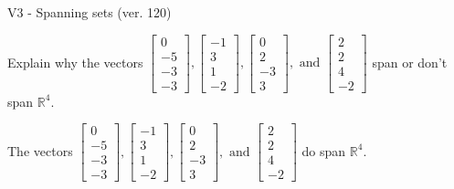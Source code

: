 \begin{exercise}
  \begin{exerciseTitle}V3 - Spanning sets (ver. 120)\end{exerciseTitle}
  \begin{exerciseStatement}
    Explain why the vectors \(\left[\begin{array}{r}
0 \\
-5 \\
-3 \\
-3
\end{array}\right] , \left[\begin{array}{r}
-1 \\
3 \\
1 \\
-2
\end{array}\right] , \left[\begin{array}{r}
0 \\
2 \\
-3 \\
3
\end{array}\right] , \text{ and } \left[\begin{array}{r}
2 \\
2 \\
4 \\
-2
\end{array}\right]\) span or don't span \(\mathbb{R}^4\). 
	


  \end{exerciseStatement}
  \begin{exerciseAnswer}
   The vectors \(\left[\begin{array}{r}
0 \\
-5 \\
-3 \\
-3
\end{array}\right] , \left[\begin{array}{r}
-1 \\
3 \\
1 \\
-2
\end{array}\right] , \left[\begin{array}{r}
0 \\
2 \\
-3 \\
3
\end{array}\right] , \text{ and } \left[\begin{array}{r}
2 \\
2 \\
4 \\
-2
\end{array}\right]\) 
  	 do  
	span \(\mathbb{R}^4\).
  


  \end{exerciseAnswer}
\end{exercise}